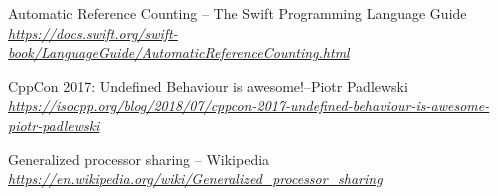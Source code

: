 \documentclass[a4paper]{article}
\begin{document}
	\begin{thebibliography}{9}
		Automatic Reference Counting -- The Swift Programming Language Guide
		\\\textit{\hyperref{https://docs.swift.org/swift-book/LanguageGuide/AutomaticReferenceCounting.html}{}{}{https://docs.swift.org/swift-book/LanguageGuide/AutomaticReferenceCounting.html}}
		
		CppCon 2017: Undefined Behaviour is awesome!--Piotr Padlewski
		\\\textit{\hyperref{https://isocpp.org/blog/2018/07/cppcon-2017-undefined-behaviour-is-awesome-piotr-padlewski}{}{}{https://isocpp.org/blog/2018/07/cppcon-2017-undefined-behaviour-is-awesome-piotr-padlewski}}
		
		Generalized processor sharing -- Wikipedia
		\\\textit{\hyperref{https://en.wikipedia.org/wiki/Generalized\_processor\_sharing}{}{}{https://en.wikipedia.org/wiki/Generalized\_processor\_sharing}}
	\end{thebibliography}
\end{document}

